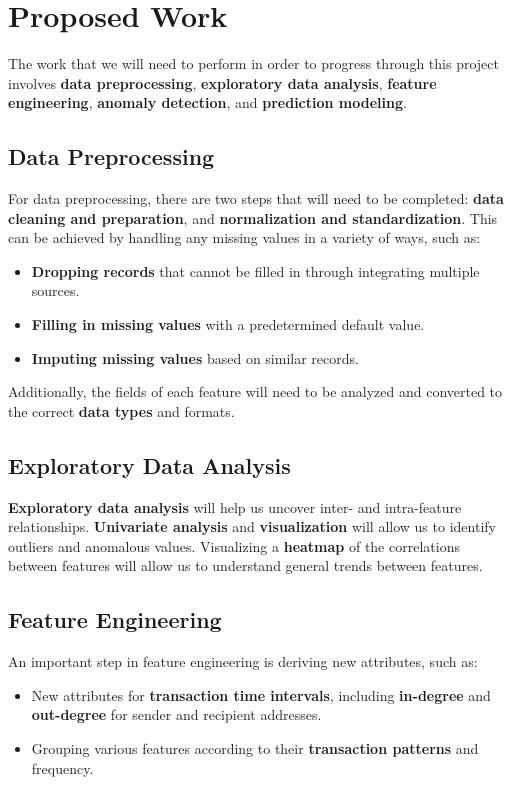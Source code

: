 \documentclass[sigconf]{acmart}
\begin{document}
\section{Proposed Work}

The work that we will need to perform in order to progress through this project involves \textbf{data preprocessing}, \textbf{exploratory data analysis}, \textbf{feature engineering}, \textbf{anomaly detection}, and \textbf{prediction modeling}.

\subsection{Data Preprocessing}
For data preprocessing, there are two steps that will need to be completed: \textbf{data cleaning and preparation}, and \textbf{normalization and standardization}. This can be achieved by handling any missing values in a variety of ways, such as:
\begin{itemize}
    \item \textbf{Dropping records} that cannot be filled in through integrating multiple sources.
    \item \textbf{Filling in missing values} with a predetermined default value.
    \item \textbf{Imputing missing values} based on similar records.
\end{itemize}
Additionally, the fields of each feature will need to be analyzed and converted to the correct \textbf{data types} and formats.

\subsection{Exploratory Data Analysis}
\textbf{Exploratory data analysis} will help us uncover inter- and intra-feature relationships. \textbf{Univariate analysis} and \textbf{visualization} will allow us to identify outliers and anomalous values. Visualizing a \textbf{heatmap} of the correlations between features will allow us to understand general trends between features.

\subsection{Feature Engineering}
An important step in feature engineering is deriving new attributes, such as:
\begin{itemize}
    \item New attributes for \textbf{transaction time intervals}, including \textbf{in-degree} and \textbf{out-degree} for sender and recipient addresses.
    \item Grouping various features according to their \textbf{transaction patterns} and frequency.
\end{itemize}
\end{document}
